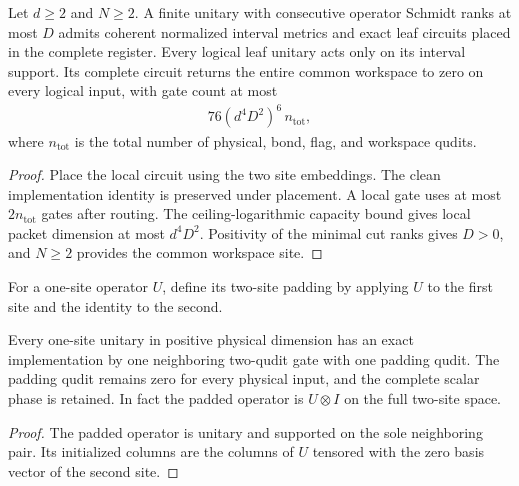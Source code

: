 \begin{lemma}
    \label{thm:mpu_minimal_leaf_placement}
    \leanok
    Let $d\geq2$ and $N\geq2$. A finite unitary with consecutive
    operator Schmidt ranks at most $D$ admits coherent normalized
    interval metrics and exact leaf circuits placed in the complete
    register. Every logical leaf unitary acts only on its interval
    support. Its complete circuit returns the entire common workspace
    to zero on every logical input, with gate count at most
    \begin{align}
        76(d^4D^2)^6\,n_{\mathrm{tot}},
    \end{align}
    where $n_{\mathrm{tot}}$ is the total number of physical, bond,
    flag, and workspace qudits.
\end{lemma}
\begin{proof}\leanok
    Place the local circuit using the two site embeddings. The clean
    implementation identity is preserved under placement. A local
    gate uses at most $2n_{\mathrm{tot}}$ gates after routing.
    The ceiling-logarithmic capacity bound gives local packet
    dimension at most $d^4D^2$. Positivity of the minimal cut ranks
    gives $D>0$, and $N\geq2$ provides the common workspace site.
\end{proof}

\begin{definition}
    \label{def:mpu_single_site_padding}
    \leanok
    For a one-site operator $U$, define its two-site padding by
    applying $U$ to the first site and the identity to the second.
\end{definition}

\begin{lemma}
    \label{thm:mpu_single_site_padding}
    \leanok
    Every one-site unitary in positive physical dimension has an exact
    implementation by one neighboring two-qudit gate with one padding
    qudit. The padding qudit remains zero for every physical
    input, and the complete scalar phase is retained. In fact the
    padded operator is $U\otimes I$ on the full two-site space.
\end{lemma}
\begin{proof}\leanok
    The padded operator is unitary and supported on the sole neighboring
    pair. Its initialized columns are the columns of $U$ tensored with
    the zero basis vector of the second site.
\end{proof}

